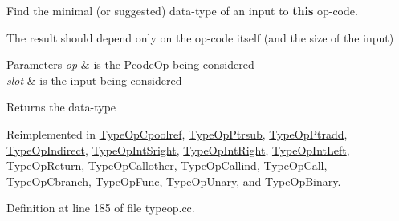 Find the minimal (or suggested) data-\/type of an input to {\bfseries{this}} op-\/code. 

The result should depend only on the op-\/code itself (and the size of the input) 
\begin{DoxyParams}{Parameters}
{\em op} & is the \mbox{\hyperlink{class_pcode_op}{Pcode\+Op}} being considered \\
\hline
{\em slot} & is the input being considered \\
\hline
\end{DoxyParams}
\begin{DoxyReturn}{Returns}
the data-\/type 
\end{DoxyReturn}


Reimplemented in \mbox{\hyperlink{class_type_op_cpoolref_a08047a47da143613ebf78d36dd22c564}{Type\+Op\+Cpoolref}}, \mbox{\hyperlink{class_type_op_ptrsub_aeb893948a1260af75942c71c4a2e19cd}{Type\+Op\+Ptrsub}}, \mbox{\hyperlink{class_type_op_ptradd_a80258521d1b2a930d1472fcf1b6c53eb}{Type\+Op\+Ptradd}}, \mbox{\hyperlink{class_type_op_indirect_a556bb0789c0ef43a825befed5f4068c4}{Type\+Op\+Indirect}}, \mbox{\hyperlink{class_type_op_int_sright_a684bdbbed1aa1ac2fc0d08caf5e0ca24}{Type\+Op\+Int\+Sright}}, \mbox{\hyperlink{class_type_op_int_right_afd6976a40304a509b940a874da58b31b}{Type\+Op\+Int\+Right}}, \mbox{\hyperlink{class_type_op_int_left_ace4697dce938154ffc5098b0c582cf3b}{Type\+Op\+Int\+Left}}, \mbox{\hyperlink{class_type_op_return_a524940b2f4716701e5d0c62b16c6b001}{Type\+Op\+Return}}, \mbox{\hyperlink{class_type_op_callother_a35cf8a5ffa9af239c20c60d0e1799719}{Type\+Op\+Callother}}, \mbox{\hyperlink{class_type_op_callind_a12ae23733dbb5b171ab30f32a90b973c}{Type\+Op\+Callind}}, \mbox{\hyperlink{class_type_op_call_ac92e69ea35780e349d3ca0cecef0a01e}{Type\+Op\+Call}}, \mbox{\hyperlink{class_type_op_cbranch_af7d6764f79c316780136fab4e67b8a3f}{Type\+Op\+Cbranch}}, \mbox{\hyperlink{class_type_op_func_a7f2860d7c345a794c665f72dbc41c44d}{Type\+Op\+Func}}, \mbox{\hyperlink{class_type_op_unary_a80df02d6ff2783f44b3c9dca6f580044}{Type\+Op\+Unary}}, and \mbox{\hyperlink{class_type_op_binary_a6b8460b8ee0e97579321c6d02fe4fd29}{Type\+Op\+Binary}}.



Definition at line 185 of file typeop.\+cc.

